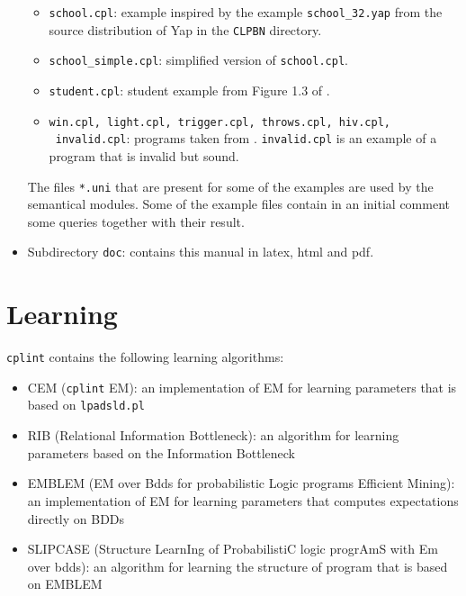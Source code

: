 \documentclass[a4paper,10pt]{article}
\begin{document}
\begin{itemize}
\begin{itemize}
\item \texttt{school.cpl}: example inspired by the example \verb|school_32.yap| from the 
source distribution of Yap in the \texttt{CLPBN} directory.
\item \verb|school_simple.cpl|: simplified version of \texttt{school.cpl}.
\item \verb|student.cpl|: student example from Figure 1.3 of \cite{GetFri01-BC}.
\item \texttt{win.cpl, light.cpl, trigger.cpl, throws.cpl, hiv.cpl,}\\ \texttt{ invalid.cpl}: programs taken from \cite{DBLP:journals/tplp/VennekensDB09}. \texttt{invalid.cpl} is an example of a  program that is invalid but sound.
\end{itemize}
The files \texttt{*.uni} that are present for some of the examples are used  by the semantical modules. Some of the example files contain in an initial comment some queries together with their result.
\item Subdirectory \texttt{doc}: contains this manual in latex, html and pdf.
\end{itemize}

\section{Learning}
\texttt{cplint} contains the following learning algorithms:
\begin{itemize}
\item CEM (\texttt{cplint} EM): an implementation of EM for learning parameters that is based on \texttt{lpadsld.pl} \cite{RigDiM11-ML-IJ}
\item RIB (Relational Information Bottleneck): an algorithm for learning parameters based on the Information Bottleneck \cite{RigDiM11-ML-IJ}
\item EMBLEM (EM over Bdds for probabilistic Logic programs Efficient Mining): an implementation of EM for learning parameters that computes expectations directly on BDDs \cite{BelRig11-IDA,BelRig11-CILC11-NC,BelRig11-TR}
\item SLIPCASE (Structure LearnIng of ProbabilistiC logic progrAmS with Em over bdds): an algorithm for learning the structure of program that is based on EMBLEM \cite{BelRig11-ILP11-IC}
\end{itemize}
\end{document}
